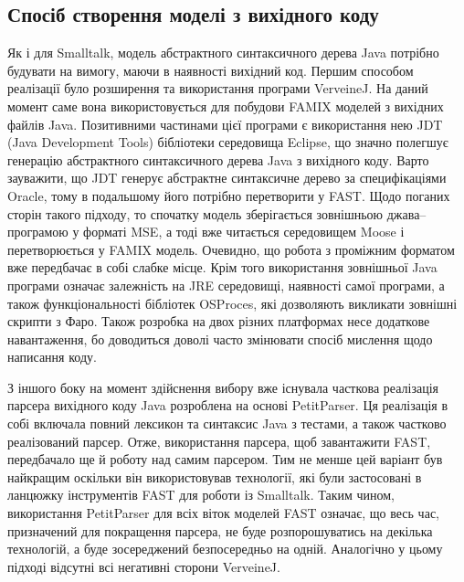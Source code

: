 \documentclass[12pt,a4paper]{article}
\begin{document}
\subsection{Спосіб створення моделі з вихідного коду}
Як і для Smalltalk, модель абстрактного синтаксичного дерева Java потрібно будувати на вимогу, маючи в наявності вихідний код. Першим способом реалізації було розширення та використання програми VerveineJ. На даний момент саме вона використовується для побудови FAMIX моделей з вихідних файлів Java. Позитивними частинами цієї програми є використання нею JDT (Java Development Tools) бібліотеки середовища Eclipse, що значно полегшує генерацію абстрактного синтаксичного дерева Java з вихідного коду. Варто зауважити, що JDT генерує абстрактне синтаксичне дерево за специфікаціями Oracle, тому в подальшому його потрібно перетворити у FAST. Щодо поганих сторін такого підходу, то спочатку модель зберігається зовнішньою джава--програмою у форматі MSE, а тоді вже читається середовищем Moose і перетворюється у FAMIX модель. Очевидно, що робота з проміжним форматом вже передбачає в собі слабке місце. Крім того використання зовнішньої Java програми означає залежність на JRE середовищі, наявності самої програми, а також функціональності бібліотек OSProces, які дозволяють викликати зовнішні скрипти з Фаро. Також розробка на двох різних платформах несе додаткове навантаження, бо доводиться доволі часто змінювати спосіб мислення щодо написання коду.

З іншого боку на момент здійснення вибору вже існувала часткова реалізація парсера вихідного коду Java розроблена на основі PetitParser. Ця реалізація в собі включала повний лексикон та синтаксис Java з тестами, а також частково реалізований парсер. Отже,  використання парсера, щоб завантажити FAST, передбачало ще й роботу над самим парсером. Тим не менше цей варіант був найкращим оскільки він використовував технології, які були застосовані в ланцюжку інструментів FAST для роботи із Smalltalk. Таким чином, використання PetitParser для всіх віток моделей FAST означає, що весь час, призначений для покращення парсера, не буде розпорошуватись на декілька технологій, а буде зосереджений безпосередньо на одній. Аналогічно у цьому підході відсутні всі негативні сторони VerveineJ.

\clearpage
\end{document}
